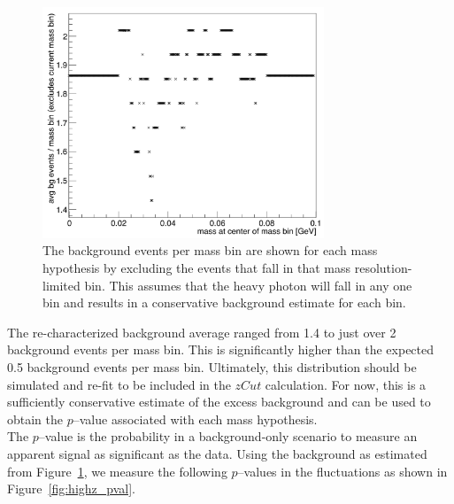 \begin{figure}[htb]
  \centering
      \includegraphics[width=0.75\textwidth]{pics/results/highz_avgBG.png}
  \caption[Re-characterization of the excess background]{The background events per mass bin are shown for each mass hypothesis by excluding the events that fall in that mass resolution-limited bin. This assumes that the heavy photon will fall in any one bin and results in a conservative background estimate for each bin.}
  \label{fig:highz_newbg}
\end{figure} 

The re-characterized background average ranged from 1.4 to just over 2 background events per mass bin. This is significantly higher than the expected 0.5 background events per mass bin. Ultimately, this distribution should be simulated and re-fit to be included in the $zCut$ calculation. For now, this is a sufficiently conservative estimate of the excess background and can be used to obtain the $p$--value associated with each mass hypothesis. \\
\indent The $p$--value is the probability in a background-only scenario to measure an apparent signal as significant as the data. Using the background as estimated from Figure~\ref{fig:highz_newbg}, we measure the following $p$--values in the fluctuations as shown in Figure~\ref{fig:highz_pval}.

